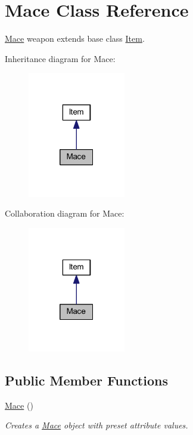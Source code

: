 \hypertarget{class_mace}{}\section{Mace Class Reference}
\label{class_mace}


\mbox{\hyperlink{class_mace}{Mace}} weapon extends base class \mbox{\hyperlink{class_item}{Item}}.  




Inheritance diagram for Mace\+:\nopagebreak
\begin{figure}[H]
\begin{center}
\leavevmode
\includegraphics[width=121pt]{class_mace__inherit__graph}
\end{center}
\end{figure}


Collaboration diagram for Mace\+:\nopagebreak
\begin{figure}[H]
\begin{center}
\leavevmode
\includegraphics[width=121pt]{class_mace__coll__graph}
\end{center}
\end{figure}
\subsection*{Public Member Functions}
\begin{DoxyCompactItemize}
\item 
\mbox{\hyperlink{class_mace_ac2299236716c045cbe4b9977394ebd9c}{Mace}} ()
\begin{DoxyCompactList}\small\item\em Creates a \mbox{\hyperlink{class_mace}{Mace}} object with preset attribute values. \end{DoxyCompactList}\end{DoxyCompactItemize}


